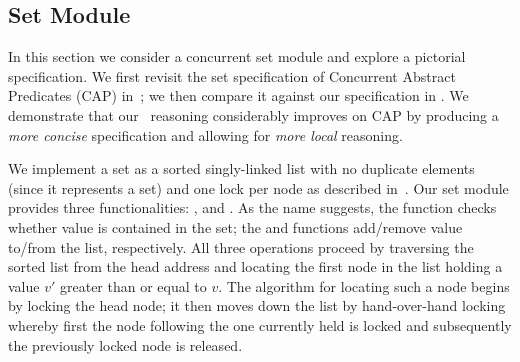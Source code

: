 \subsection{Set Module}
\vspace{-.5ex}
\label{sec:set}
In this section we consider a concurrent set module and explore a pictorial specification. We first revisit the set specification of Concurrent Abstract Predicates (CAP) in~\cite{cap-ecoop10}; we then compare it against our specification in \colosl. We demonstrate that our \colosl\ reasoning considerably improves on CAP by producing a \emph{more concise} specification and allowing for \emph{more local} reasoning. 

We implement a set as a sorted singly-linked list with no duplicate elements (since it represents a set) and one lock per node as described in~\cite{cap-ecoop10}. Our set module provides three functionalities: ,  and .
As the name suggests, the  function checks whether value  is contained in the set; the  and  functions add/remove value  to/from the list, respectively.
%
All three operations proceed by traversing the sorted list from the head address and locating the first node in the list holding a value $v'$ greater than or equal to $v$. The algorithm for locating such a node begins by locking the head node; it then moves down the list by hand-over-hand locking whereby first the node following the one currently held is locked and subsequently the previously locked node is released. 
%

